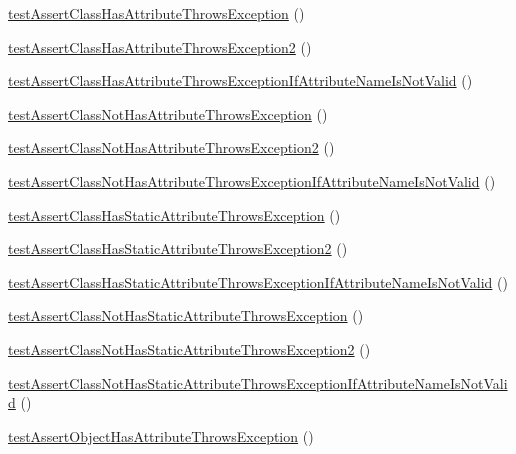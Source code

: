 \begin{DoxyCompactItemize}
\item 
\mbox{\hyperlink{class_framework___assert_test_a6289afbf2b05fd6437d4705e4babf6a2}{test\+Assert\+Class\+Has\+Attribute\+Throws\+Exception}} ()
\item 
\mbox{\hyperlink{class_framework___assert_test_a9fe53c13877286d01827285fd770121e}{test\+Assert\+Class\+Has\+Attribute\+Throws\+Exception2}} ()
\item 
\mbox{\hyperlink{class_framework___assert_test_a5ba270678ef05c7dc0a4feca16886d6c}{test\+Assert\+Class\+Has\+Attribute\+Throws\+Exception\+If\+Attribute\+Name\+Is\+Not\+Valid}} ()
\item 
\mbox{\hyperlink{class_framework___assert_test_a568c036e63a7cd6d34d84eaa73d5ef7e}{test\+Assert\+Class\+Not\+Has\+Attribute\+Throws\+Exception}} ()
\item 
\mbox{\hyperlink{class_framework___assert_test_a9fd2fefc6cd660f64d6483144c09c926}{test\+Assert\+Class\+Not\+Has\+Attribute\+Throws\+Exception2}} ()
\item 
\mbox{\hyperlink{class_framework___assert_test_ad351c051475492b7b7cf4c891947402b}{test\+Assert\+Class\+Not\+Has\+Attribute\+Throws\+Exception\+If\+Attribute\+Name\+Is\+Not\+Valid}} ()
\item 
\mbox{\hyperlink{class_framework___assert_test_ad48f6d5d7cc460c5abd14dd5b22f17ec}{test\+Assert\+Class\+Has\+Static\+Attribute\+Throws\+Exception}} ()
\item 
\mbox{\hyperlink{class_framework___assert_test_a8f93674464bdf5033850f0b8bf96ef99}{test\+Assert\+Class\+Has\+Static\+Attribute\+Throws\+Exception2}} ()
\item 
\mbox{\hyperlink{class_framework___assert_test_abd7237dd8656323930621bca1b4a2e90}{test\+Assert\+Class\+Has\+Static\+Attribute\+Throws\+Exception\+If\+Attribute\+Name\+Is\+Not\+Valid}} ()
\item 
\mbox{\hyperlink{class_framework___assert_test_aecae788885aef6e8909d89cf5dd23685}{test\+Assert\+Class\+Not\+Has\+Static\+Attribute\+Throws\+Exception}} ()
\item 
\mbox{\hyperlink{class_framework___assert_test_ab840267d185de4e2690811028f3e9394}{test\+Assert\+Class\+Not\+Has\+Static\+Attribute\+Throws\+Exception2}} ()
\item 
\mbox{\hyperlink{class_framework___assert_test_aad8c6faaf0ac2519f4d1a7c1618c7c2d}{test\+Assert\+Class\+Not\+Has\+Static\+Attribute\+Throws\+Exception\+If\+Attribute\+Name\+Is\+Not\+Valid}} ()
\item 
\mbox{\hyperlink{class_framework___assert_test_ade9f8bfe691c43f7ccecce017263f3b8}{test\+Assert\+Object\+Has\+Attribute\+Throws\+Exception}} ()

\end{DoxyCompactItemize}
